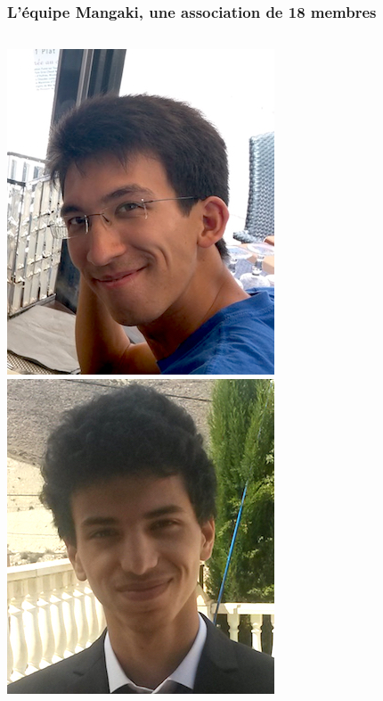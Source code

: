 \documentclass[handout]{beamer}
\begin{document}
\begin{frame}
	\frametitle{L'équipe Mangaki, une association de 18 membres}
	\begin{columns}
	\begin{column}{0.2\textwidth}
	\includegraphics[width=\linewidth]{figures/jj.jpg}\\[-1mm]
	\includegraphics[width=\linewidth]{figures/ryan.jpg}\\[-1mm]

\end{column}
\end{columns}
\end{frame}
\end{document}
